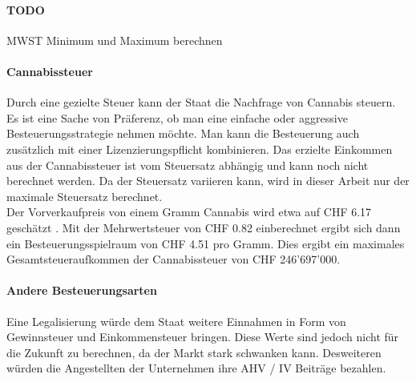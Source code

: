 \documentclass[../main.tex]{subfiles}
\begin{document}
	 \paragraph{TODO} MWST Minimum und Maximum berechnen	 
	 
	 
	 
	 
	 \paragraph{Cannabissteuer}
	 Durch eine gezielte Steuer kann der Staat die Nachfrage von Cannabis steuern. 
	 Es ist eine Sache von Präferenz, ob man eine einfache oder aggressive Besteuerungsstrategie nehmen möchte.
	 Man kann die Besteuerung auch zusätzlich mit einer Lizenzierungspflicht kombinieren.
	 Das erzielte Einkommen aus der Cannabissteuer ist vom Steuersatz abhängig und kann noch nicht berechnet werden.
	 Da der Steuersatz variieren kann, wird in dieser Arbeit nur der maximale Steuersatz berechnet.\\
	 
	 \noindent
	 Der Vorverkaufpreis von einem Gramm Cannabis wird etwa auf CHF 6.17 geschätzt \cite{bandli}.
	 Mit der Mehrwertsteuer von CHF 0.82 einberechnet ergibt sich dann ein Besteuerungsspielraum von CHF 4.51 pro Gramm.
	 Dies ergibt ein maximales Gesamtsteueraufkommen der Cannabissteuer von CHF 246'697'000.
	 
	 
	 \paragraph{Andere Besteuerungsarten}
	 Eine Legalisierung würde dem Staat weitere Einnahmen in Form von Gewinnsteuer und Einkommensteuer bringen.
	 Diese Werte sind jedoch nicht für die Zukunft zu berechnen, da der Markt stark schwanken kann.
	 Desweiteren würden die Angestellten der Unternehmen ihre AHV / IV Beiträge bezahlen.
	 
	 
\end{document}

